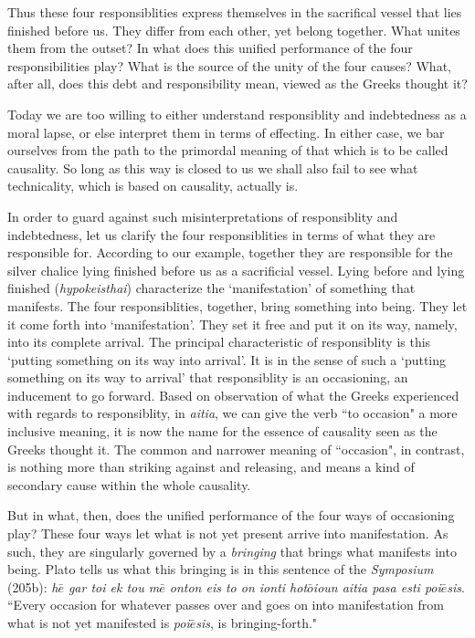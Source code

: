 \documentclass[paper=a4, fontsize=11pt,twoside]{scrartcl}
\begin{document}
Thus these four responsiblities express themselves in the sacrifical vessel that lies finished before us. They differ from each other, yet belong together. What unites them from the outset? In what does this unified performance of the four responsibilities play? What is the source of the unity of the four causes? What, after all, does this debt and responsibility mean, viewed as the Greeks thought it? 

Today we are too willing to either understand responsiblity and indebtedness as a moral lapse, or else interpret them in terms of effecting. In either case, we bar ourselves from the path to the primordal meaning of that which is to be called causality. So long as this way is closed to us we shall also fail to see what technicality, which is based on causality, actually is.

In order to guard against such misinterpretations of responsiblity and indebtedness, let us clarify the four responsiblities in terms of what they are responsible for. According to our example, together they are responsible for the silver chalice lying finished before us as a sacrificial vessel. Lying before and lying finished (\textit{hypokeisthai}) characterize the `manifestation' of something that manifests. The four responsiblities, together, bring something into being. They let it come forth into `manifestation'. They set it free and put it on its way, namely, into its complete arrival. The principal characteristic of responsiblity is this `putting something on its way into arrival'. It is in the sense of such a `putting something on its way to arrival' that responsiblity is an occasioning, an inducement to go forward. Based on observation of what the Greeks experienced with regards to responsiblity, in \textit{aitia}, we can give the verb ``to occasion" a more inclusive meaning, it is now the name for the essence of causality seen as the Greeks thought it. The common and narrower meaning of ``occasion", in contrast, is nothing more than striking against and releasing, and means a kind of secondary cause within the whole causality.

But in what, then, does the unified performance of the four ways of occasioning play? These four ways let what is not yet present arrive into manifestation. As such, they are singularly governed by a \textit{bringing} that brings what manifests into being. Plato tells us what this bringing is in this sentence of the \textit{Symposium} (205b): \textit{h$\bar{e}$ gar toi ek tou m$\bar{e}$ onton eis to on ionti hot$\bar{o}$ioun aitia pasa esti poi$\bar{e}$sis}. ``Every occasion for whatever passes over and goes on into manifestation from what is not yet manifested is \textit{poi$\bar{e}$sis}, is bringing-forth."
\end{document}
